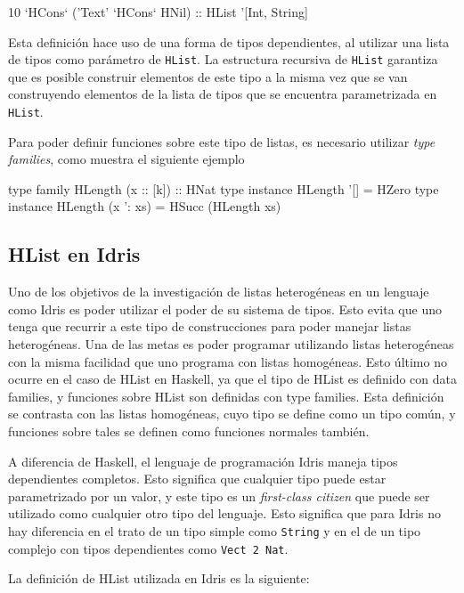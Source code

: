 \begin{code}
10 `HCons` ('Text' `HCons` HNil) :: HList '[Int, String]
\end{code}

Esta definición hace uso de una forma de tipos dependientes, al utilizar una lista de tipos como parámetro de \texttt{HList}. La estructura recursiva de \texttt{HList} garantiza que es posible construir elementos de este tipo a la misma vez que se van construyendo elementos de la lista de tipos que se encuentra parametrizada en \texttt{HList}.

Para poder definir funciones sobre este tipo de listas, es necesario utilizar \textit{type families}, como muestra el siguiente ejemplo

\begin{code}
type family HLength (x :: [k]) :: HNat
type instance HLength '[] = HZero
type instance HLength (x ': xs) = HSucc (HLength xs)
\end{code}

\subsection{HList en Idris}

Uno de los objetivos de la investigación de listas heterogéneas en un lenguaje como Idris es poder utilizar el poder de su sistema de tipos. Esto evita que uno tenga que recurrir a este tipo de construcciones para poder manejar listas heterogéneas. Una de las metas es poder programar utilizando listas heterogéneas con la misma facilidad que uno programa con listas homogéneas.
Esto último no ocurre en el caso de HList en Haskell, ya que el tipo de HList es definido con data families, y funciones sobre HList son definidas con type families. Esta definición se contrasta con las listas homogéneas, cuyo tipo se define como un tipo común, y funciones sobre tales se definen como funciones normales también.

A diferencia de Haskell, el lenguaje de programación Idris maneja tipos dependientes completos. Esto significa que cualquier tipo puede estar parametrizado por un valor, y este tipo es un \textit{first-class citizen} que puede ser utilizado como cualquier otro tipo del lenguaje. Esto significa que para Idris no hay diferencia en el trato de un tipo simple como \texttt{String} y en el de un tipo complejo con tipos dependientes como \texttt{Vect 2 Nat}.

La definición de HList utilizada en Idris es la siguiente:


